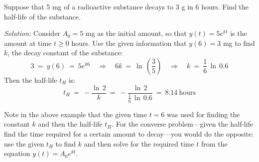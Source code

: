 \begin{exmp}
 Suppose that 5 mg of a radioactive substance decays to 3 g in 6 hours. Find the
 half-life of the substance.\vspace{1mm}
 \par\noindent\emph{Solution:} Consider $A_0 = 5$ mg as the initial amount, so
 that $y(t) = 5 e^{kt}$ is the amount at time $t \ge 0$ hours. Use the
 given information that $y(6) = 3$ mg to find  $k$, the decay constant of the
 substance:
 \begin{displaymath}
  3 ~=~ y(6) ~=~ 5 e^{k6} \quad\Rightarrow\quad 6k ~=~ \ln\,\left(\frac{3}{5}\right)
  \quad\Rightarrow\quad k ~=~ \frac{1}{6}\,\ln\,0.6
 \end{displaymath}
 Then the half-life $t_H$ is:
 \begin{displaymath}
 t_H ~=~ -\frac{\ln\,2}{k} ~=~ -\frac{\ln\,2}{\frac{1}{6}\,\ln\,0.6} ~=~ 8.14 ~\text{hours}
 \end{displaymath}
\end{exmp}
\divider
\vspace{3mm}

\par\noindent Note in the above example that the given time $t = 6$ was used for
finding the constant $k$ and then the half-life $t_H$. For the converse
problem---given the half-life find the time required for a certain amount to
decay---you would do the opposite: use the given $t_H$ to find $k$ and then
solve for the required time $t$ from the equation $y(t) = A_0 e^{kt}$.

